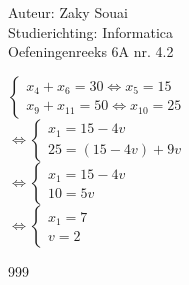 \documentclass[a4paper]{article}
\begin{document}
  
\noindent \large Auteur: Zaky Souai \\
\noindent \large Studierichting:  Informatica\\
\noindent \large Oefeningenreeks 6A nr. 4.2\\

\bigskip

\normalsize

$ \left\{
\begin{array}{l}
    x_{4} + x_{6} = 30 \Leftrightarrow x_{5} = 15 \\
    x_{9} + x_{11} = 50 \Leftrightarrow x_{10} = 25 
\end{array}
\right.$ \\

$\Leftrightarrow \left\{
\begin{array}{l}
    x_{1} = 15 - 4v \\
    25 = \left( 15-4v \right) + 9v  
\end{array}
\right.$ \\

$\Leftrightarrow \left\{
\begin{array}{l}
    x_{1} = 15 - 4v \\
    10 = 5v 
\end{array}
\right.$ \\

$\Leftrightarrow \left\{
\begin{array}{l}
    x_{1} = 7 \\
    v = 2
\end{array}
\right.$ \\


\begin{thebibliography}{999}
\end{thebibliography}
\end{document}
